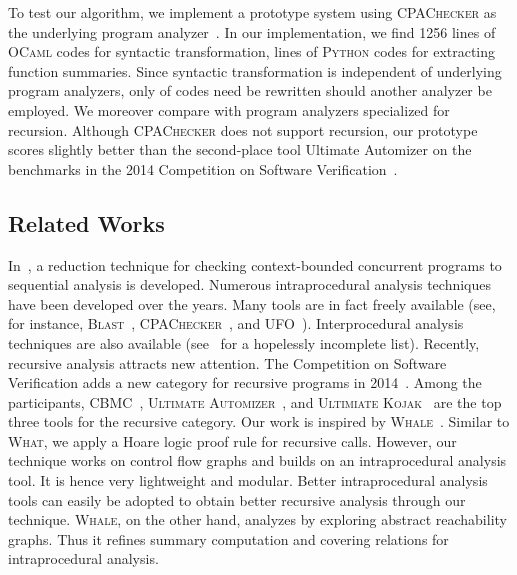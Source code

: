 To test our algorithm, we implement a prototype system using \textsc{CPAChecker} as the underlying program analyzer~\cite{BeyerK11}. In our implementation, we find 1256 lines of \textsc{OCaml} codes for syntactic transformation,  lines of \textsc{Python} codes for extracting function summaries. Since syntactic transformation is independent of underlying program analyzers, only  of codes need be rewritten should another analyzer be employed. We moreover compare with program analyzers specialized for recursion. Although \textsc{CPAChecker} does not support recursion, our prototype scores slightly better than the second-place tool Ultimate Automizer on the benchmarks in the 2014 Competition on Software Verification~\cite{svcomp14}. 


\subsection*{Related Works}
In~\cite{LalR08,LalR09}, a reduction technique for checking context-bounded concurrent programs to sequential analysis is developed. Numerous intraprocedural analysis techniques have been developed over the years. Many tools are in fact freely available (see, for instance, \textsc{Blast}~\cite{BeyerHJM07}, \textsc{CPAChecker}~\cite{BeyerK11}, and \textsc{UFO}~\cite{AlbarghouthiLGC12}). Interprocedural analysis techniques are also available (see~\cite{RepsHS95,BallR01} for a hopelessly incomplete list). Recently, recursive analysis attracts new attention. The Competition on Software Verification adds a new category for recursive programs in 2014~\cite{svcomp14}. Among the participants, \textsc{CBMC}~\cite{ClarkeKL04}, \textsc{Ultimate Automizer}~\cite{HeizmannCDEHLNSP13}, and \textsc{Ultimiate Kojak}~\cite{Kojak} are the top three tools for the recursive category. Our work is inspired by \textsc{Whale}~\cite{AlbarghouthiGC12}. Similar to \textsc{What}, we apply a Hoare logic proof rule for recursive calls. However, our technique works on control flow graphs and builds on an intraprocedural analysis tool. It is hence very lightweight and modular. Better intraprocedural analysis tools can easily be adopted to obtain better recursive analysis through our technique. \textsc{Whale}, on the other hand, analyzes by exploring abstract reachability graphs. Thus it refines summary computation and covering relations for intraprocedural analysis.

